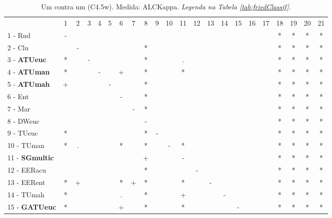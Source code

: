\begin{table}[h]
\caption{Um contra um (C4.5w). Medida: ALCKappa. \textit{Legenda na Tabela \ref{tab:friedClassif}.}}
\begin{center}\begin{tabular}{lcc|cc|cc|cc|cc|cc|cc|cc|cc|cc|c}
 			& 1 & 2 & 3 & 4 & 5 & 6 & 7 & 8 & 9 & 10 & 11 & 12 & 13 & 14 & 15 & 16 & 17 & 18 & 19 & 20 & 21\\
1 - Rnd  	& - &   &   &   &   &   &   &   &   &   &   &   &   &   &   &   &   & * & * & * & * \\
2 - Clu  	&   & - &   &   &   &   &   & * &   &   &   &   &   &   &   &   &   & * & * & * & * \\ \hline
3 - \textbf{ATUeuc}	& * &   & - &   &   &   &   & * &   &   & . &   &   &   &   &   &   & * & * & * & * \\
4 - \textbf{ATUman}	& * &   &   & - &   & + &   & * &   &   & * &   &   &   &   &   &   & * & * & * & * \\ \hline
5 - \textbf{ATUmah}	& + &   &   &   & - &   &   & * &   &   &   &   &   &   &   &   &   & * & * & * & * \\
6 - Ent  	&   &   &   &   &   & - &   & * &   &   &   &   &   &   &   &   &   & * & * & * & * \\ \hline
7 - Mar  	&   &   &   &   &   &   & - & * &   &   &   &   &   &   &   &   &   & * & * & * & * \\
8 - DWeuc	&   &   &   &   &   &   &   & - &   &   &   &   &   &   &   &   &   & * & * & * & * \\ \hline
9 - TUeuc	& * &   &   &   &   &   &   & * & - &   &   &   &   &   &   &   &   & * & * & * & * \\
10 - TUman	& * & . &   &   &   & * &   & * &   & - & * &   &   &   &   &   &   & * & * & * & * \\ \hline
11 - \textbf{SGmultic}	&   &   &   &   &   &   &   & + &   &   & - &   &   &   &   &   &   & * & * & * & * \\
12 - EERacu	&   &   &   &   &   &   &   & * &   &   &   & - &   &   &   &   &   & * & * & * & * \\ \hline
13 - EERent	& * & + &   &   &   & * & + & * &   &   & * &   & - &   &   &   &   & * & * & * & * \\
14 - TUmah	& * &   &   &   &   & . &   & * &   &   & + &   &   & - &   &   &   & * & * & * & * \\ \hline
15 - \textbf{GATUeuc}	& * &   &   &   &   & + &   & * &   &   & * &   &   &   & - &   &   & * & * & * & * \\

\end{tabular}
\end{center}
\end{table}
